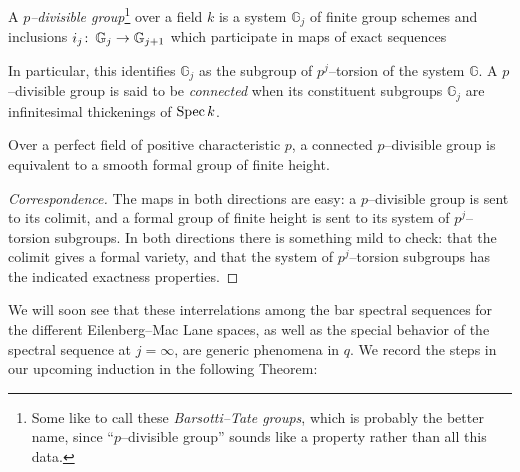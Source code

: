\begin{definition}
A \textit{$p$--divisible group}\footnote{Some like to call these \textit{Barsotti--Tate groups}, which is probably the better name, since ``$p$--divisible group'' sounds like a property rather than all this data.} over a field $k$ is a system $\mathbb G_j$ of finite group schemes and inclusions $i_j\colon\thinspace \mathbb G_j \to \mathbb G_{j+1}$ which participate in maps of exact sequences
\begin{center}
\end{center}
In particular, this identifies $\mathbb G_j$ as the subgroup of $p^j$--torsion of the system $\mathbb G$.  A $p$--divisible group is said to be \textit{connected} when its constituent subgroups $\mathbb G_j$ are infinitesimal thickenings of $\operatorname{Spec} k$.
\end{definition}

\begin{lemma}
Over a perfect field of positive characteristic $p$, a connected $p$--divisible group is equivalent to a smooth formal group of finite height.
\end{lemma}
\begin{proof}[Correspondence]
The maps in both directions are easy: a $p$--divisible group is sent to its colimit, and a formal group of finite height is sent to its system of $p^j$--torsion subgroups.  In both directions there is something mild to check: that the colimit gives a formal variety, and that the system of $p^j$--torsion subgroups has the indicated exactness properties.
\end{proof}

We will soon see that these interrelations among the bar spectral sequences for the different Eilenberg--Mac Lane spaces, as well as the special behavior of the spectral sequence at $j = \infty$, are generic phenomena in $q$.  We record the steps in our upcoming induction in the following Theorem:

